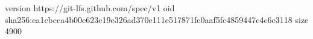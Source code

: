 version https://git-lfs.github.com/spec/v1
oid sha256:ea1cbcca4b00e623e19e326ad370e111e517871fe0aaf5fc4859447c4c6c3118
size 4900
